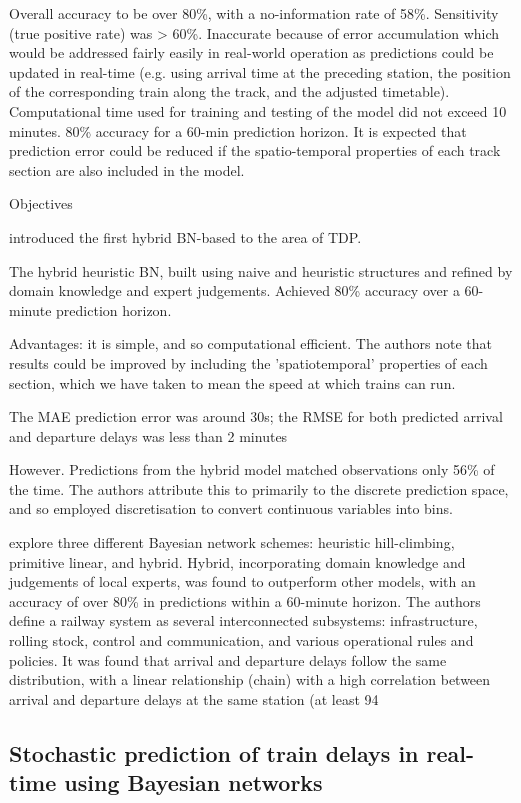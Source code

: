 \documentclass{article}
\begin{document}
Overall accuracy to be over 80\%, with a no-information rate of 58\%. Sensitivity (true positive rate) was > 60\%. 
Inaccurate because of error accumulation which would be addressed fairly easily in real-world operation as predictions could be updated in real-time (e.g. using arrival time at the preceding station, the position of the corresponding train along the track, and the adjusted timetable). Computational time used for training and testing of the model did not exceed 10 minutes.
80\% accuracy for a 60-min prediction horizon. It is expected that prediction error could be reduced if the spatio-temporal properties of each track section are also included in the model. 



Objectives

 introduced the first hybrid BN-based to the area of TDP. 

The hybrid heuristic BN, built using naive and heuristic structures and refined by domain knowledge and expert judgements.
Achieved 80\% accuracy over a 60-minute prediction horizon. 

Advantages: it is simple, and so computational efficient.
The authors note that results could be improved by including the 'spatiotemporal' properties of each section, which we have taken to mean the speed at which trains can run. 

The MAE prediction error was around 30s; the RMSE for both predicted arrival and departure delays was less than 2 minutes

However. Predictions from the hybrid model matched observations only 56\% of the time. The authors attribute this to primarily to the discrete prediction space, and so employed discretisation to convert continuous variables into bins.  

explore three different Bayesian network schemes: heuristic hill-climbing, primitive linear, and hybrid. Hybrid, incorporating domain knowledge and judgements of local experts, was found to outperform other models, with an accuracy of over 80\% in predictions within a 60-minute horizon. The authors define a railway system as several interconnected subsystems: infrastructure, rolling stock, control and communication, and various operational rules and policies. 
It was found that arrival and departure delays follow the same distribution, with a linear relationship (chain) with a high correlation between arrival and departure delays at the same station (at least 94%

\subsection{Stochastic prediction of train delays in real-time using Bayesian networks \cite{corman_kecman_2018}}
\end{document}
